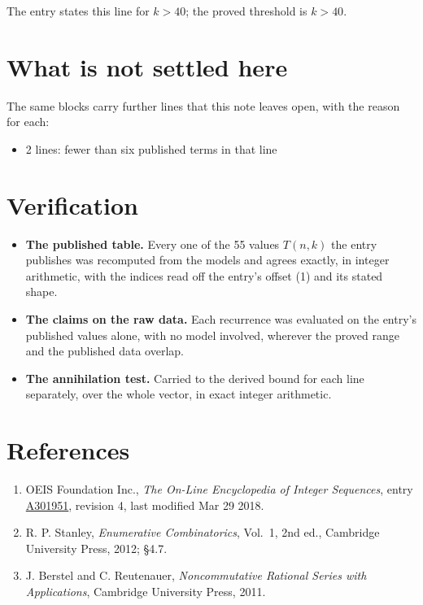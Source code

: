 \documentclass[11pt]{article}
\theoremstyle{definition}
\begin{document}
The entry states this line for $k > 40$; the proved threshold is $k > 40$.

\section{What is not settled here}

The same blocks carry further lines that this note leaves open, with the reason for each:

\begin{itemize}

\item 2 lines: fewer than six published terms in that line

\end{itemize}

\section{Verification}

\begin{itemize}

\item {\bfseries The published table.} Every one of the 55 values $T(n,k)$ the entry publishes was recomputed from the models and agrees exactly, in integer arithmetic, with the indices read off the entry's offset (1) and its stated shape.

\item {\bfseries The claims on the raw data.} Each recurrence was evaluated on the entry's published values alone, with no model involved, wherever the proved range and the published data overlap.

\item {\bfseries The annihilation test.} Carried to the derived bound for each line separately, over the whole vector, in exact integer arithmetic.

\end{itemize}

\section{References}

\begin{enumerate}

\item OEIS Foundation Inc., \emph{The On-Line Encyclopedia of Integer Sequences}, entry \href{https://oeis.org/A301951}{A301951}, revision 4, last modified Mar 29 2018.

\item R. P. Stanley, \emph{Enumerative Combinatorics}, Vol.~1, 2nd ed., Cambridge University Press, 2012; \S4.7.

\item J. Berstel and C. Reutenauer, \emph{Noncommutative Rational Series with Applications}, Cambridge University Press, 2011.

\end{enumerate}
\end{document}

